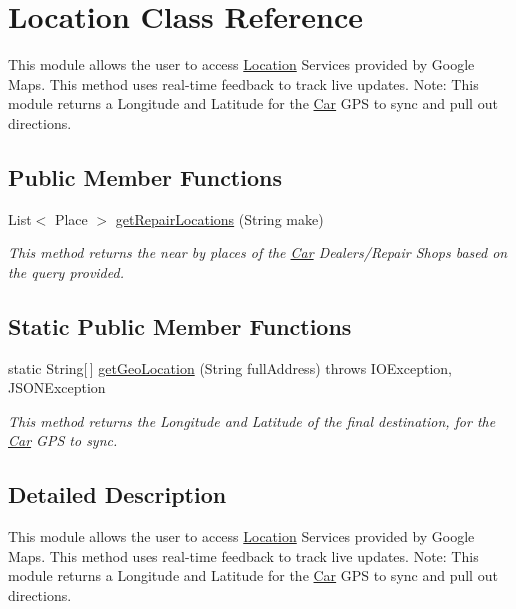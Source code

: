 \hypertarget{class_location}{}\section{Location Class Reference}
\label{class_location}


This module allows the user to access \hyperlink{class_location}{Location} Services provided by Google Maps. This method uses real-\/time feedback to track live updates. Note\+: This module returns a Longitude and Latitude for the \hyperlink{class_car}{Car} G\+P\+S to sync and pull out directions.  


\subsection*{Public Member Functions}
\begin{DoxyCompactItemize}
\item 
List$<$ Place $>$ \hyperlink{class_location_a412914849ee10bb42704f307895eefd4}{get\+Repair\+Locations} (String make)
\begin{DoxyCompactList}\small\item\em This method returns the near by places of the \hyperlink{class_car}{Car} Dealers/\+Repair Shops based on the query provided. \end{DoxyCompactList}\end{DoxyCompactItemize}
\subsection*{Static Public Member Functions}
\begin{DoxyCompactItemize}
\item 
static String\mbox{[}$\,$\mbox{]} \hyperlink{class_location_a4d15b4e4c8bff7adb0bc33898040f215}{get\+Geo\+Location} (String full\+Address)  throws I\+O\+Exception, J\+S\+O\+N\+Exception 
\begin{DoxyCompactList}\small\item\em This method returns the Longitude and Latitude of the final destination, for the \hyperlink{class_car}{Car} G\+P\+S to sync. \end{DoxyCompactList}\end{DoxyCompactItemize}


\subsection{Detailed Description}
This module allows the user to access \hyperlink{class_location}{Location} Services provided by Google Maps. This method uses real-\/time feedback to track live updates. Note\+: This module returns a Longitude and Latitude for the \hyperlink{class_car}{Car} G\+P\+S to sync and pull out directions. 

